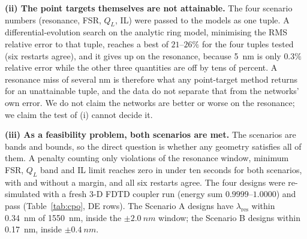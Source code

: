 \documentclass[11pt]{article}
\newcommand{\lres}{\lambda_{\mathrm{res}}}
\newcommand{\QL}{Q_L}
\begin{document}
\textbf{(ii) The point targets themselves are not attainable.} The four scenario numbers (resonance, FSR, $\QL$, IL) were passed to the models as one tuple. A differential-evolution search on the analytic ring model, minimising the RMS relative error to that tuple, reaches a best of $21$--$26\%$ for the four tuples tested (six restarts agree), and it gives up on the resonance, because \SI{5}{nm} is only $0.3\%$ relative error while the other three quantities are off by tens of percent. A resonance miss of several nm is therefore what any point-target method returns for an unattainable tuple, and the data do not separate that from the networks' own error. We do not claim the networks are better or worse on the resonance; we claim the test of (i) cannot decide it.

\textbf{(iii) As a feasibility problem, both scenarios are met.} The scenarios are bands and bounds, so the direct question is whether any geometry satisfies all of them. A penalty counting only violations of the resonance window, minimum FSR, $\QL$ band and IL limit reaches zero in under ten seconds for both scenarios, with and without a margin, and all six restarts agree. The four designs were re-simulated with a fresh 3-D FDTD coupler run (energy sum $0.9999$--$1.0000$) and pass (Table~\ref{tab:cpo}, DE rows). The Scenario A designs have $\lres$ within \SI{0.34}{nm} of \SI{1550}{nm}, inside the $\pm\SI{2.0}{nm}$ window; the Scenario B designs within \SI{0.17}{nm}, inside $\pm\SI{0.4}{nm}$.
\end{document}
